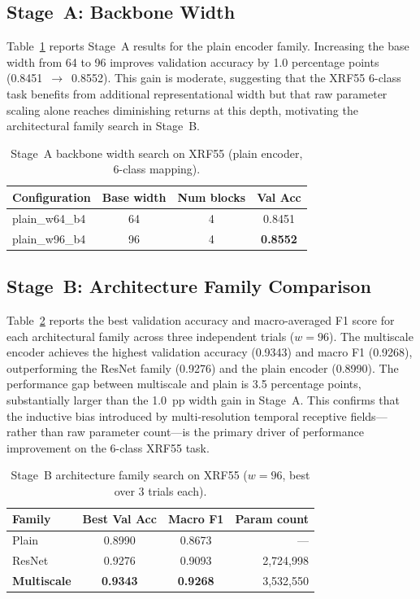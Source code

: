 \documentclass[english,bibtex]{kththesis}
\begin{document}
\subsection{Stage~A: Backbone Width}

Table~\ref{tab:stagea} reports Stage~A results for the plain encoder family. Increasing the base width from 64 to 96 improves validation accuracy by 1.0 percentage points (0.8451~$\to$~0.8552). This gain is moderate, suggesting that the XRF55 6-class task benefits from additional representational width but that raw parameter scaling alone reaches diminishing returns at this depth, motivating the architectural family search in Stage~B.

\begin{table}[!ht]
\caption{Stage~A backbone width search on XRF55 (plain encoder, 6-class mapping).}
\label{tab:stagea}
\centering
\begin{tabular}{lccc}
\toprule
\textbf{Configuration} & \textbf{Base width} & \textbf{Num blocks} & \textbf{Val Acc} \\
\midrule
plain\_w64\_b4 & 64 & 4 & 0.8451 \\
plain\_w96\_b4 & 96 & 4 & \textbf{0.8552} \\
\bottomrule
\end{tabular}
\end{table}

\subsection{Stage~B: Architecture Family Comparison}

Table~\ref{tab:stageb} reports the best validation accuracy and macro-averaged F1 score for each architectural family across three independent trials ($w = 96$). The multiscale encoder achieves the highest validation accuracy (0.9343) and macro F1 (0.9268), outperforming the ResNet family (0.9276) and the plain encoder (0.8990). The performance gap between multiscale and plain is 3.5 percentage points, substantially larger than the 1.0~pp width gain in Stage~A. This confirms that the inductive bias introduced by multi-resolution temporal receptive fields---rather than raw parameter count---is the primary driver of performance improvement on the 6-class XRF55 task.

\begin{table}[!ht]
\caption{Stage~B architecture family search on XRF55 ($w = 96$, best over 3 trials each).}
\label{tab:stageb}
\centering
\begin{tabular}{lccr}
\toprule
\textbf{Family} & \textbf{Best Val Acc} & \textbf{Macro F1} & \textbf{Param count} \\
\midrule
Plain           & 0.8990 & 0.8673 &             --- \\
ResNet          & 0.9276 & 0.9093 & 2{,}724{,}998 \\
\textbf{Multiscale} & \textbf{0.9343} & \textbf{0.9268} & 3{,}532{,}550 \\
\bottomrule
\end{tabular}
\end{table}
\end{document}
